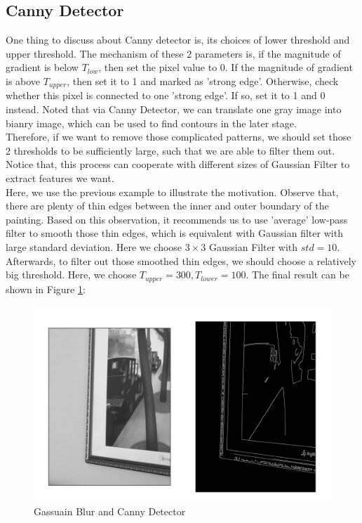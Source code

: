 \documentclass{article}
\begin{document}
\subsection{Canny Detector}
One thing to discuss about Canny detector is, its choices of lower threshold and upper threshold. The mechanism of these 2 parameters is, if the magnitude of gradient is below $T_{low}$, then set the pixel value to 0. If the magnitude of gradient is above $T_{upper}$, then set it to 1 and marked as 'strong edge'. Otherwise, check whether this pixel is connected to one 'strong edge'. If so, set it to 1 and 0 instead. Noted that via Canny Detector, we can translate one gray image into bianry image, which can be used to find contours in the later stage.
\vspace{4pt}
\\
Therefore, if we want to remove those complicated patterns, we should set those 2 thresholds to be sufficiently large, such that we are able to filter them out. Notice that, this process can cooperate with different sizes of Gaussian Filter to extract features we want.
\vspace{4pt}
\\
Here, we use the previous example to illustrate the motivation. Observe that, there are plenty of thin edges between the inner and outer boundary of the painting. Based on this observation, it recommends us to use 'average' low-pass filter to smooth those thin edges, which is equivalent with Gaussian filter with large standard deviation. Here we choose $3\times 3$ Gaussian Filter with $std = 10$. Afterwards, to filter out those smoothed thin edges, we should choose a relatively big threshold. Here, we choose $T_{upper} = 300, T_{lower} = 100$. The final result can be shown in Figure \ref{fig:002}:
\begin{figure}[h]
	\centering
	\includegraphics[width=.4\textheight]{fig2.png}
	\caption{Gassuain Blur and Canny Detector}
	\label{fig:002}
\end{figure}
\end{document}
